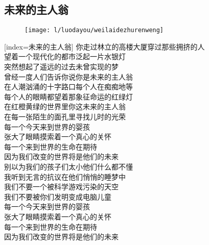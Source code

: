 
	

\subsection{未来的主人翁}

\begin{figure}[htp]
	\begin{center}
	  \texttt{[image: l/luodayou/weilaidezhurenweng]}
	  \label{fig:weilaidezhurenweng}
	\end{center}
\end{figure}

\begin{songs}{}
  [index={未来的主人翁}]
	你走过林立的高楼大厦穿过那些拥挤的人	\\
	望着一个现代化的都市泛起一片水银灯	\\
	突然想起了遥远的过去未曾实现的梦	\\
	曾经一度人们告诉你说你是未来的主人翁	\\
	\vspace{2ex}
	在人潮汹涌的十字路口每个人在痴痴地等	\\
	每个人的眼睛都望着那象征命运的红绿灯	\\
	在红橙黄绿的世界里你这未来的主人翁	\\
	在每一张陌生的面孔里寻找儿时的光荣	\\
	\vspace{2ex}
	每一个今天来到世界的婴孩	\\
	张大了眼睛摸索着一个真心的关怀	\\
	每一个来到世界的生命在期待	\\
	因为我们改变的世界将是他们的未来	\\
	\vspace{2ex}
	别以为我们的孩子们太小他们什么都不懂	\\
	我听到无言的抗议在他们悄悄的睡梦中	\\
	我们不要一个被科学游戏污染的天空	\\
	我们不要被你们发明变成电脑儿童	\\
	\vspace{2ex}
	每一个今天来到世界的婴孩	\\
	张大了眼睛摸索着一个真心的关怀	\\
	每一个来到世界的生命在期待	\\
	因为我们改变的世界将是他们的未来	\\

\end{songs}
